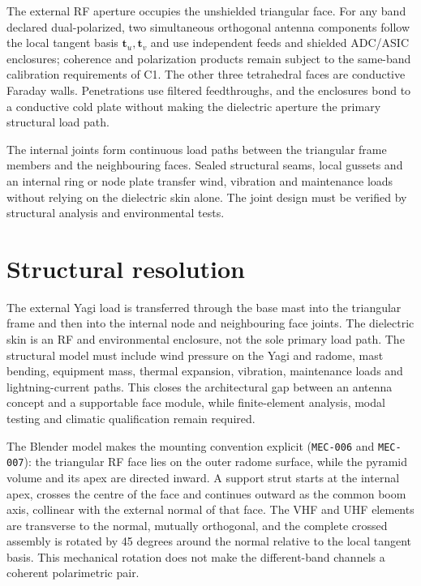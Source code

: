 The external RF aperture occupies the unshielded triangular face. For any band declared dual-polarized, two simultaneous orthogonal antenna components follow the local tangent basis $\mathbf{t}_u,\mathbf{t}_v$ and use independent feeds and shielded ADC/ASIC enclosures; coherence and polarization products remain subject to the same-band calibration requirements of C1. The other three tetrahedral faces are conductive Faraday walls. Penetrations use filtered feedthroughs, and the enclosures bond to a conductive cold plate without making the dielectric aperture the primary structural load path.



The internal joints form continuous load paths between the triangular frame members and the neighbouring faces. Sealed structural seams, local gussets and an internal ring or node plate transfer wind, vibration and maintenance loads without relying on the dielectric skin alone. The joint design must be verified by structural analysis and environmental tests.

\section{Structural resolution}
The external Yagi load is transferred through the base mast into the triangular frame and then into the internal node and neighbouring face joints. The dielectric skin is an RF and environmental enclosure, not the sole primary load path. The structural model must include wind pressure on the Yagi and radome, mast bending, equipment mass, thermal expansion, vibration, maintenance loads and lightning-current paths. This closes the architectural gap between an antenna concept and a supportable face module, while finite-element analysis, modal testing and climatic qualification remain required.



The Blender model makes the mounting convention explicit (\texttt{MEC-006} and \texttt{MEC-007}): the triangular RF face lies on the outer radome surface, while the pyramid volume and its apex are directed inward. A support strut starts at the internal apex, crosses the centre of the face and continues outward as the common boom axis, collinear with the external normal of that face. The VHF and UHF elements are transverse to the normal, mutually orthogonal, and the complete crossed assembly is rotated by 45 degrees around the normal relative to the local tangent basis. This mechanical rotation does not make the different-band channels a coherent polarimetric pair.


